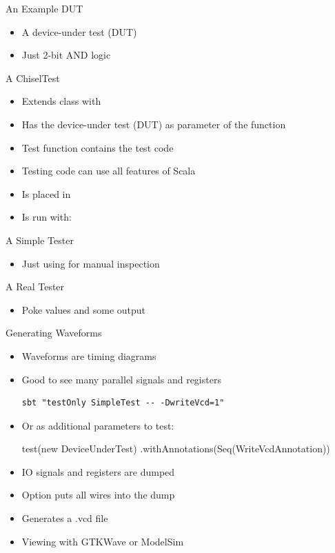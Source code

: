 \begin{frame}[fragile]{An Example DUT}
\begin{itemize}
\item A device-under test (DUT)
\item Just 2-bit AND logic
\end{itemize}
\end{frame}

\begin{frame}[fragile]{A ChiselTest}
\begin{itemize}
\item Extends class  with 
\item Has the device-under test (DUT) as parameter of the  function
\item Test function contains the test code
\item Testing code can use all features of Scala
\item Is placed in 
\item Is run with: 
\end{itemize}
\end{frame}

\begin{frame}[fragile]{A Simple Tester}
\begin{itemize}
\item Just using  for manual inspection
\end{itemize}
\end{frame}


\begin{frame}[fragile]{A Real Tester}
\begin{itemize}
\item Poke values and  some output
\end{itemize}
\end{frame}



\begin{frame}[fragile]{Generating Waveforms}
\begin{itemize}
\item Waveforms are timing diagrams
\item Good to see many parallel signals and registers
\begin{verbatim}
sbt "testOnly SimpleTest -- -DwriteVcd=1"
\end{verbatim}
\item Or as additional parameters to test:
\begin{chisel}
test(new DeviceUnderTest)
.withAnnotations(Seq(WriteVcdAnnotation))
\end{chisel}
\item IO signals and registers are dumped
\item Option  puts all wires into the dump
\item Generates a .vcd file
\item Viewing with GTKWave or ModelSim
\end{itemize}
\end{frame}

